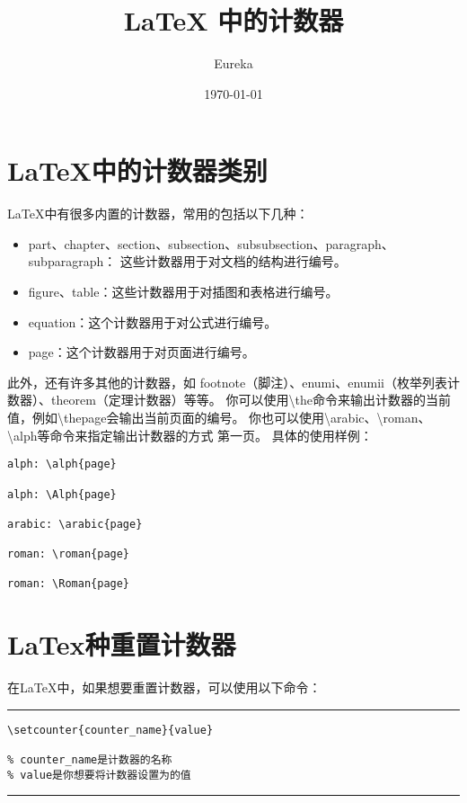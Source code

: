 \documentclass[12pt]{article}
\title{LaTeX 中的计数器}
\author{Eureka}
\date{\today}
\newcommand{\m}{\textbackslash}
\newcommand{\hl}{\noindent\rule{1\linewidth}{.1em}}
\begin{document}
\maketitle

\section{LaTeX中的计数器类别}
LaTeX中有很多内置的计数器，常用的包括以下几种：

\begin{itemize}
    \item part、chapter、section、subsection、subsubsection、paragraph、subparagraph：
          这些计数器用于对文档的结构进行编号。
    \item figure、table：这些计数器用于对插图和表格进行编号。
    \item equation：这个计数器用于对公式进行编号。
    \item page：这个计数器用于对页面进行编号。
\end{itemize}

此外，还有许多其他的计数器，如 footnote（脚注）、enumi、enumii（枚举列表计数器）、theorem（定理计数器）等等。
你可以使用\m the命令来输出计数器的当前值，例如\m thepage会输出当前页面的编号。
你也可以使用\m arabic、\m roman、\m alph等命令来指定输出计数器的方式
第一页。 具体的使用样例：

\begin{verbatim}
alph: \alph{page}

alph: \Alph{page}

arabic: \arabic{page}

roman: \roman{page}

roman: \Roman{page}
\end{verbatim}


\section{LaTex种重置计数器}

在LaTeX中，如果想要重置计数器，可以使用以下命令：

\hl
\begin{verbatim}
\setcounter{counter_name}{value}

% counter_name是计数器的名称
% value是你想要将计数器设置为的值
\end{verbatim}
\hl
\end{document}
